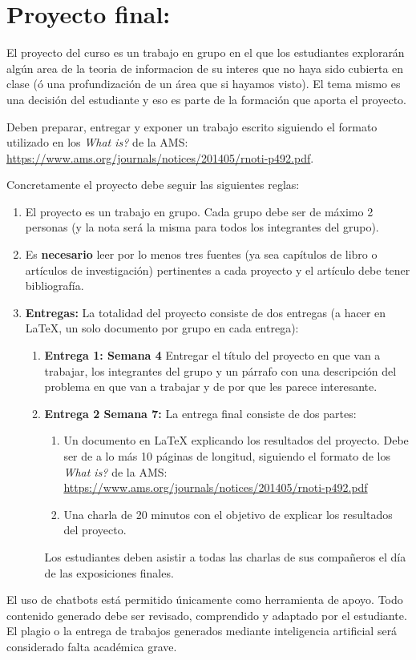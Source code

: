 \documentclass[11pt]{article}
\date{}
\begin{document}
\section*{Proyecto final:}
El proyecto del curso es un trabajo en grupo en el que los estudiantes explorarán algún area de la teoria de informacion de su interes que no haya sido cubierta en clase (ó una profundización de un área que si hayamos visto). El tema mismo es una decisión del estudiante y eso es parte de la formación que aporta el proyecto.

Deben preparar, entregar y exponer un trabajo escrito siguiendo el formato utilizado en los \textit{What is?} de la AMS: \url{https://www.ams.org/journals/notices/201405/rnoti-p492.pdf}.

Concretamente el proyecto debe seguir las siguientes reglas:

\begin{enumerate}
    \item El proyecto es un trabajo en grupo. Cada grupo debe ser de máximo 2 personas (y la nota será la misma para todos los integrantes del grupo).

    \item Es {\bf necesario} leer por lo menos tres fuentes (ya sea capítulos de libro o artículos de investigación) pertinentes a cada proyecto y el artículo debe tener bibliografía.

    \item \textbf{Entregas:} La totalidad del proyecto consiste de dos entregas (a hacer en \LaTeX, un solo documento por grupo en cada entrega):
    
    \begin{enumerate}[label=\alph*)]
        \item \textbf{Entrega 1: Semana 4} Entregar el título del proyecto en que van a trabajar, los integrantes del grupo y un párrafo con una descripción del problema en que van a trabajar y de por que les parece interesante.        
        \item \textbf{Entrega 2 Semana 7:} La entrega final consiste de dos partes:
        \begin{enumerate}
            \item Un documento en \LaTeX{} explicando los resultados del proyecto. Debe ser de a lo más 10 páginas de longitud, siguiendo el formato de los \textit{What is?} de la AMS: \url{https://www.ams.org/journals/notices/201405/rnoti-p492.pdf}
            \item Una charla de 20 minutos con el objetivo de explicar los resultados del proyecto.            
        \end{enumerate}
            Los estudiantes deben asistir a todas las charlas de sus compañeros el día de las exposiciones finales.
    \end{enumerate}
\end{enumerate}
El uso de chatbots está permitido únicamente como herramienta de apoyo. Todo contenido generado debe ser revisado, comprendido y adaptado por el estudiante. El plagio o la entrega de trabajos generados mediante inteligencia artificial será considerado falta académica grave.
\end{document}
